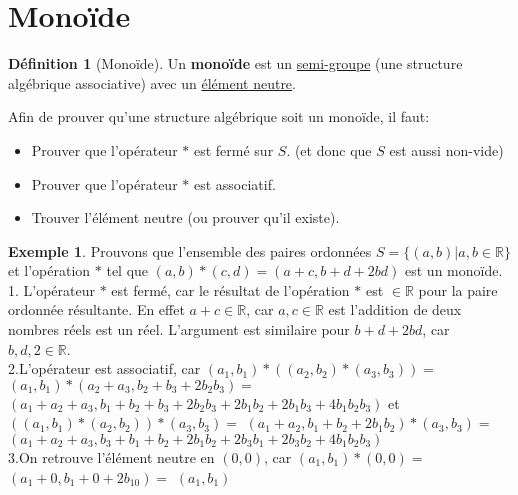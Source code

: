 \documentclass[12pt]{book}
\let\Bbb\mathbb
\def\sep{\phantom{}}
\newcommand\todo[1]{\phantom{#1}}
\theoremstyle{definition}
\newtheorem{definition}{Définition}[section]
\newtheorem*{example}{Exemple}
\begin{document}
\section{Monoïde}
\begin{definition}[Monoïde]
    \label{def:monoide}
    Un \textbf{monoïde} est un \hyperref[def:semi_groupe]{semi-groupe} (une structure algébrique associative) avec un \hyperref[def:neutre]{élément neutre}.
\end{definition}
Afin de prouver qu'une structure algébrique soit un monoïde, il faut:
\begin{itemize}
    \item Prouver que l'opérateur $\ast$ est fermé sur $S$. (et donc que $S$ est aussi non-vide)
    \item Prouver que l'opérateur $\ast$ est associatif.
    \item Trouver l'élément neutre (ou prouver qu'il existe).
\end{itemize}
\todo{Add exemple 2.26}
\begin{example}
    Prouvons que l'ensemble des paires ordonnées $S = \{(a, b) | a, b \in \Bbb R\}$ et l'opération $\ast$ tel que $(a, b) \ast (c, d) = (a + c, b + d + 2bd)$ est un monoïde. \sep \\
    1. L'opérateur $\ast$ est fermé, car le résultat de l'opération $\ast$ est $\in \Bbb R$ pour la paire ordonnée résultante.\sep 
    En effet $a + c \in \Bbb R$, car $a, c \in \Bbb R$ est l'addition de deux nombres réels est un réel. \sep 
    L'argument est similaire pour $b + d + 2bd$, car $b, d, 2 \in \Bbb R$. \sep \\
    2.L'opérateur est associatif, car $(a_1,b_1) \ast ( (a_2, b_2) \ast (a_3, b_3) ) =  $ \sep $(a_1,b_1) \ast (a_2 + a_3, b_2 + b_3 + 2b_2b_3) =$ \sep  $(a_1 + a_2 + a_3, b_1 + b_2 + b_3 + 2b_2b_3 + 2b_1b_2 + 2b_1b_3 + 4b_1b_2b_3)$ \sep 
    et $( (a_1,b_1) \ast (a_2, b_2)  ) \ast (a_3, b_3) = $ \sep $ (a_1 + a_2, b_1 + b_2 + 2b_1b_2) \ast (a_3, b_3) = $ \sep $(a_1 + a_2 + a_3, b_3 + b_1 + b_2 + 2b_1b_2 + 2b_3b_1 + 2b_3b_2 + 4b_1b_2b_3)$ \\
    3.On retrouve l'élément neutre en $(0, 0)$, car $(a_1, b_1) \ast (0, 0) =$ \sep $(a_1 + 0, b_1 + 0 + 2b_10) = $ \sep $(a_1, b_1)$
\end{example}
\end{document}
